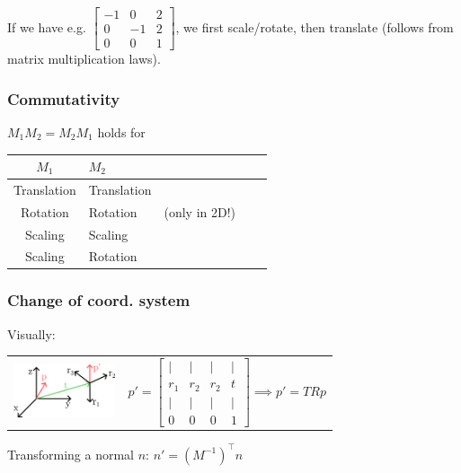 \documentclass[a4paper,10pt]{article}
\renewcommand*{\arraystretch}{2}
\begin{document}
\egroup
If we have e.g. \(  \left[\begin{smallmatrix} -1 & 0 & 2 \\ 0 & -1 & 2 \\ 0 & 0 & 1 \end{smallmatrix}\right] \), we first scale/rotate, then translate (follows from matrix multiplication laws).

\subsubsection{Commutativity}
\( M_1 M_{2} = M_{2} M_{1} \) holds for
\begin{center}
    {\renewcommand{\arraystretch}{1.2}
    \begin{tabularx}{\linewidth}{c>{\centering\arraybackslash}Xc>{\centering\arraybackslash}Xc}
	\toprule
	\( M_{1} \) & \( M_{2} \) & \\
	\midrule
	Translation & Translation & \\
	Rotation & Rotation & (only in 2D!) \\
	Scaling & Scaling &\\
	Scaling & Rotation & \\
	\bottomrule
    \end{tabularx}
    }
\end{center}

\subsubsection{Change of coord. system} Visually:

\begin{tabular}{m{3cm}r}
    \includegraphics[width=3cm]{coord-system-change.png}
&
$
 p' = \left[\begin{smallmatrix} | & | & | & | \\ r_1 & r_2 & r_2 & t \\ | & | & | & | \\ 0 & 0 & 0 & 1 \end{smallmatrix}\right] \implies p' = TRp
$
\\
\end{tabular}

Transforming a normal \( n \): \( n' = (M^{-1})^\top n \)
\end{document}
